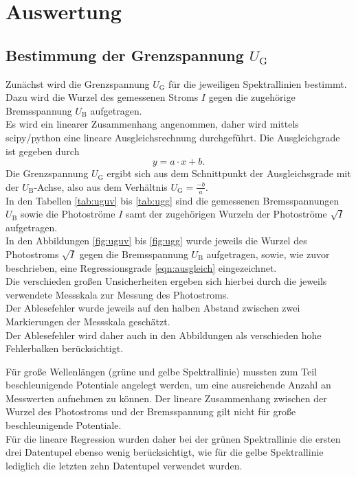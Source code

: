 \section{Auswertung}
\label{sec:Auswertung}

\subsection{Bestimmung der Grenzspannung $U_\mathrm{G}$}
Zunächst wird die Grenzspannung $U_\mathrm{G}$ für die jeweiligen Spektrallinien bestimmt. \\Dazu wird die Wurzel des gemessenen Stroms $I$ gegen die zugehörige Bremsspannung $U_\mathrm{B}$ aufgetragen.\\
Es wird ein linearer Zusammenhang angenommen, daher wird mittels scipy/python \cite{scipy} eine lineare Ausgleichsrechnung durchgeführt.
Die Ausgleichgrade ist gegeben durch
\begin{equation}
  \label{eqn:ausgleich}
y=a \cdot x +b \text{.}
\end{equation}
Die Grenzspannung $U_\mathrm{G}$ ergibt sich aus dem Schnittpunkt der Ausgleichsgrade mit der $U_\mathrm{B}$-Achse, also aus dem Verhältnis $U_\mathrm{G}=\frac{-b}{a}$.
\\In den Tabellen \ref{tab:uguv} bis \ref{tab:ugg} sind die gemessenen Bremsspannungen $U_\mathrm{B}$ sowie die Photoströme $I$ samt der zugehörigen Wurzeln der Photoströme $\sqrt{I}$ aufgetragen.\\
In den Abbildungen \ref{fig:uguv} bis \ref{fig:ugg} wurde jeweils die Wurzel des Photostroms $\sqrt{I}$ gegen die Bremsspannung $U_\mathrm{B}$ aufgetragen, sowie, wie zuvor beschrieben, eine Regressionsgrade \ref{eqn:ausgleich} eingezeichnet.\\
Die verschieden großen Unsicherheiten ergeben sich hierbei durch die jeweils verwendete Messskala zur Messung des Photostroms. \\Der Ablesefehler wurde jeweils auf den halben Abstand zwischen zwei Markierungen der Messskala geschätzt. \\Der Ablesefehler wird daher auch in den Abbildungen als verschieden hohe Fehlerbalken berücksichtigt.


Für große Wellenlängen (grüne und gelbe Spektrallinie) mussten zum Teil beschleunigende Potentiale angelegt werden, um eine ausreichende Anzahl an Messwerten aufnehmen zu können. Der lineare Zusammenhang zwischen der Wurzel des Photostroms und der Bremsspannung gilt nicht für große beschleunigende Potentiale.\\
Für die lineare Regression wurden daher bei der grünen Spektrallinie die ersten drei Datentupel ebenso wenig berücksichtigt, wie für die gelbe Spektrallinie lediglich die letzten zehn Datentupel verwendet wurden.\\


